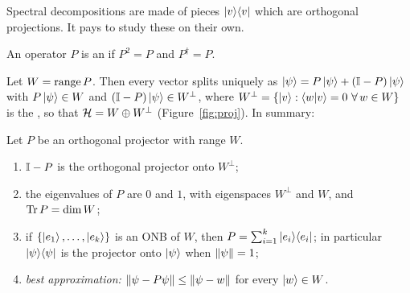 Spectral decompositions are made of pieces $\left|v\right\rangle\!\left\langle v\right|$ which are orthogonal projections. It pays to study these on their own.

\begin{definition}\label{def:projector}
  An operator $P$ is an  if $P^2=P$ and $P^\dagger=P$.
\end{definition}

Let $W=\operatorname{range} P$. Then every vector splits uniquely as $\left|\psi\right\rangle=P\left|\psi\right\rangle+(\mathbb{I}-P)\left|\psi\right\rangle$ with $P\left|\psi\right\rangle\in W$ and $(\mathbb{I}-P)\left|\psi\right\rangle\in W^\perp$, where $W^\perp=\{\left|v\right\rangle:\left\langle w\middle|v\right\rangle=0\ \forall\,w\in W\}$ is the , so that $\mathcal{H}=W\oplus W^\perp$ (Figure~\ref{fig:proj}). In summary:

\begin{proposition}\label{prop:proj}
  Let $P$ be an orthogonal projector with range $W$.
  \begin{enumerate}
    \item[(a)] $\mathbb{I}-P$ is the orthogonal projector onto $W^\perp$;
    \item[(b)] the eigenvalues of $P$ are $0$ and $1$, with eigenspaces $W^\perp$ and $W$, and $\operatorname{Tr} P=\dim W$;
    \item[(c)] if $\{\left|e_1\right\rangle,\dots,\left|e_k\right\rangle\}$ is an ONB of $W$, then $P=\sum_{i=1}^k\left|e_i\right\rangle\!\left\langle e_i\right|$; in particular $\left|\psi\right\rangle\!\left\langle\psi\right|$ is the projector onto $\left|\psi\right\rangle$ when $\left\|\psi\right\|=1$;
    \item[(d)] \emph{best approximation:} $\left\|\psi-P\psi\right\|\le\left\|\psi-w\right\|$ for every $\left|w\right\rangle\in W$.
  \end{enumerate}
\end{proposition}
